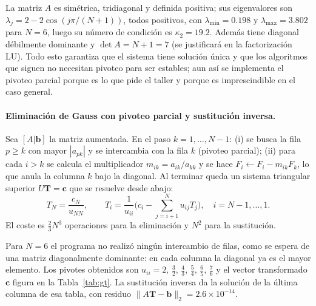 \documentclass[11pt,a4paper]{article}
\newcommand{\vect}[1]{\bm{#1}}
\begin{document}
La matriz $A$ es simétrica, tridiagonal y definida positiva; sus eigenvalores son $\lambda_j=2-2\cos(j\pi/(N+1))$, todos positivos, con $\lambda_{\min}=0.198$ y $\lambda_{\max}=3.802$ para $N=6$, luego su número de condición es $\kappa_2=19.2$. Además tiene diagonal débilmente dominante y $\det A=N+1=7$ (se justificará en la factorización LU). Todo esto garantiza que el sistema tiene solución única y que los algoritmos que siguen no necesitan pivoteo para ser estables; aun así se implementa el pivoteo parcial porque es lo que pide el taller y porque es imprescindible en el caso general.

\paragraph{Eliminación de Gauss con pivoteo parcial y sustitución inversa.}
Sea $[A|\vect b]$ la matriz aumentada. En el paso $k=1,\dots,N-1$: (i) se busca la fila $p\ge k$ con mayor $|a_{pk}|$ y se intercambia con la fila $k$ (pivoteo parcial); (ii) para cada $i>k$ se calcula el multiplicador $m_{ik}=a_{ik}/a_{kk}$ y se hace $F_i\leftarrow F_i-m_{ik}F_k$, lo que anula la columna $k$ bajo la diagonal. Al terminar queda un sistema triangular superior $U\vect T=\vect c$ que se resuelve desde abajo:
\begin{equation}
T_N=\frac{c_N}{u_{NN}},\qquad T_i=\frac{1}{u_{ii}}\Big(c_i-\sum_{j=i+1}^{N}u_{ij}T_j\Big),\quad i=N-1,\dots,1. \label{eq:back}
\end{equation}
El coste es $\tfrac23N^3$ operaciones para la eliminación y $N^2$ para la sustitución.

Para $N=6$ el programa no realizó ningún intercambio de filas, como se espera de una matriz diagonalmente dominante: en cada columna la diagonal ya es el mayor elemento. Los pivotes obtenidos son $u_{ii}=2,\,\tfrac32,\,\tfrac43,\,\tfrac54,\,\tfrac65,\,\tfrac76$ y el vector transformado $\vect c$ figura en la Tabla~\ref{tab:gt}. La sustitución inversa da la solución de la última columna de esa tabla, con residuo $\|A\vect T-\vect b\|_2=2.6\times10^{-14}$.

\begin{table}[H]\centering\small
\resizebox{\textwidth}{!}{}
\caption{Factorización LU tridiagonal ($l_i$, $u_i$) y eliminación de Gauss ($\vect c$, $\vect T$) para $N=6$ y $q_1=5000$ W/m$^3$. Los pivotes verifican $u_i=(i+1)/i$.}\label{tab:gt}
\end{table}
\end{document}

